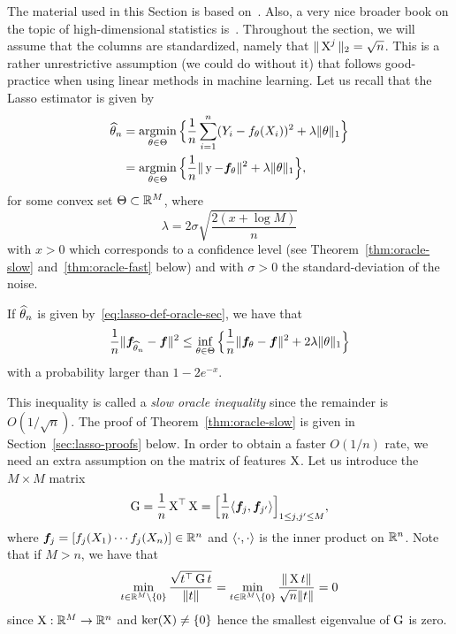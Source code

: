 The material used in this Section is based on~.
Also, a very nice broader book on the topic of high-dimensional statistics is~\cite{giraud2014introduction}.
Throughout the section, we will assume that the columns are standardized, namely that $\| \operatorname{{\boldsymbol X}}^j \|_2 = \sqrt n$.
This is a rather unrestrictive assumption (we could do without it) that follows good-practice when using linear methods in machine learning.
Let us recall that the Lasso estimator is given by
\begin{equation}
	\label{eq:lasso-def-oracle-sec}
	\begin{split}
	\widehat \theta_n &= \operatorname*{argmin}_{\theta \in \Theta} \Big\{ \frac 1n \sum_{i=1}^n (Y_i - f_\theta(X_i))^2 + \lambda \| \theta \|_1 \Big\} \\
	&= \operatorname*{argmin}_{\theta \in \Theta} \Big\{ 
	\frac 1n \| \operatorname{{\boldsymbol y}} - {\boldsymbol f}_\theta \|^2 + \lambda \| \theta \|_1 
	\Big\},
	\end{split}
\end{equation}
for some convex set $\Theta \subset \mathbb R^M$, where 
\begin{equation*}
	\lambda = 2 \sigma \sqrt{\frac{2(x + \log M)}{n}}
\end{equation*}
with $x > 0$ which corresponds to a confidence level (see Theorem~\ref{thm:oracle-slow} and~\ref{thm:oracle-fast} below) and with $\sigma > 0$ the standard-deviation of the noise.
\begin{theorem}
	\label{thm:oracle-slow}
	If $\widehat \theta_n$ is given by~\eqref{eq:lasso-def-oracle-sec}, we have that
	\begin{equation*}
		\frac 1n \| {\boldsymbol f}_{\widehat \theta_n} - {\boldsymbol f} \|^2 \leq \inf_{\theta \in \Theta} 
		\Big\{ \frac 1n \| {\boldsymbol f}_{\theta} - {\boldsymbol f} \|^2  + 2 \lambda \| \theta \|_1 \Big\}
	\end{equation*}
	with a probability larger than $1 - 2 e^{-x}$.
\end{theorem}
This inequality is called a \emph{slow oracle inequality} since the remainder is $O(1 / \sqrt{n})$.
The proof of Theorem~\ref{thm:oracle-slow} is given in Section~\ref{sec:lasso-proofs} below.
In order to obtain a faster $O(1 / n)$ rate, we need an extra assumption on the matrix of features $\operatorname{{\boldsymbol X}}$.
Let us introduce the $M \times M$ matrix 
\begin{equation*}
	\operatorname{{\boldsymbol G}} = \frac 1n \operatorname{{\boldsymbol X}}^\top \operatorname{{\boldsymbol X}} = 
	\Big[ \frac 1n \langle {\boldsymbol f}_j, {\boldsymbol f}_{j'} \rangle \Big]_{1 \leq j, j' \leq M},
\end{equation*}
where ${\boldsymbol f}_j = [f_j(X_1) \cdots f_j(X_n)] \in \mathbb R^n$ and $\langle \cdot, \cdot \rangle$ is the inner product on $\mathbb R^n$.
Note that if $M > n$, we have that
\begin{equation*}
	\min_{t \in \mathbb R^M \setminus \{ 0 \}} \frac{\sqrt{t^\top \operatorname{{\boldsymbol G}} t}}{\| t \|} 
	= \min_{t \in \mathbb R^M \setminus \{ 0 \}} \frac{\| \operatorname{{\boldsymbol X}} t \|}{\sqrt n \| t \|} = 0
\end{equation*}
since $\operatorname{{\boldsymbol X}} : \mathbb R^M \rightarrow \mathbb R^n$ and $\ker(\operatorname{{\boldsymbol X}}) \neq \{ 0 \}$ hence the smallest eigenvalue of $\operatorname{{\boldsymbol G}}$ is zero.

